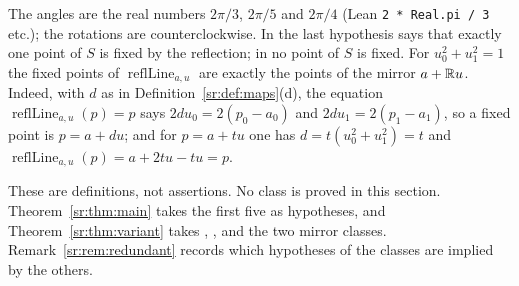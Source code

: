 \begin{definition}
The angles are the real numbers $2\pi/3$, $2\pi/5$ and $2\pi/4$ (Lean \texttt{2 * Real.pi / 3} etc.); the rotations are
counterclockwise. In  the last hypothesis says that exactly one point of $S$ is fixed by the
reflection; in  no point of $S$ is fixed. For $u_0^2+u_1^2=1$ the fixed points of
$\operatorname{reflLine}_{a,u}$ are exactly the points of the mirror $a+\mathbb R u$. Indeed, with $d$ as in
Definition~\ref{sr:def:maps}(d), the equation $\operatorname{reflLine}_{a,u}(p)=p$ says $2du_0=2(p_0-a_0)$ and
$2du_1=2(p_1-a_1)$, so a fixed point is $p=a+du$; and for $p=a+tu$ one has $d=t(u_0^2+u_1^2)=t$ and
$\operatorname{reflLine}_{a,u}(p)=a+2tu-tu=p$.
\end{definition}

These are definitions, not assertions. No class is proved in this section. Theorem~\ref{sr:thm:main} takes the first
five as hypotheses, and Theorem~\ref{sr:thm:variant} takes , ,  and
the two mirror classes. Remark~\ref{sr:rem:redundant} records which hypotheses of the classes are implied by the others.

